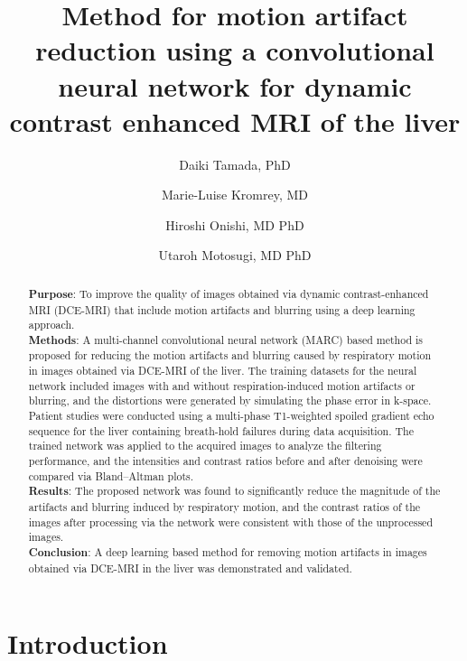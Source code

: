 \documentclass[num-refs]{wiley-article}
\title{Method for motion artifact reduction using a convolutional neural network for dynamic contrast enhanced MRI of the liver}
\author[1\authfn{1}]{Daiki Tamada, PhD}
\author[1\authfn{2}]{Marie-Luise Kromrey, MD}
\author[1\authfn{2}]{Hiroshi Onishi, MD PhD}
\author[1\authfn{2}]{Utaroh Motosugi, MD PhD}
\affil[1]{Department of Radiology, University of Yamanashi, Chuo, Yamanashi, 409-3898, Japan}
\begin{document}
\maketitle

\begin{abstract}

\textbf{Purpose}: To improve the quality of images obtained via dynamic contrast-enhanced MRI (DCE-MRI) that include motion artifacts and blurring using a deep learning approach.\\
\textbf{Methods}: A multi-channel convolutional neural network (MARC) based method is proposed for reducing the motion artifacts and blurring caused by respiratory motion in images obtained via DCE-MRI of the liver. The training datasets for the neural network included images with and without respiration-induced motion artifacts or blurring, and the distortions were generated by simulating the phase error in k-space. Patient studies were conducted using a multi-phase T1-weighted spoiled gradient echo sequence for the liver containing breath-hold failures during data acquisition. The trained network was applied to the acquired images to analyze the filtering performance, and the intensities and contrast ratios before and after denoising were compared via Bland–Altman plots.\\
\textbf{Results}: The proposed network was found to significantly reduce the magnitude of the artifacts and blurring induced by respiratory motion, and the contrast ratios of the images after processing via the network were consistent with those of the unprocessed images.\\
\textbf{Conclusion}: A deep learning based method for removing motion artifacts in images obtained via DCE-MRI in the liver was demonstrated and validated.

\end{abstract}

\section{Introduction}
\end{document}
